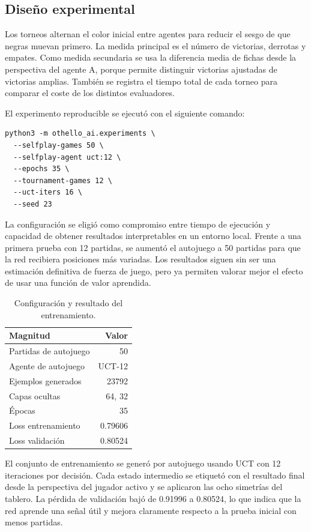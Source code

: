 \documentclass[conference,a4paper]{IEEEtran}
\begin{document}
\subsection{Diseño experimental}

Los torneos alternan el color inicial entre agentes para reducir el sesgo de que
negras muevan primero. La medida principal es el número de victorias, derrotas y
empates. Como medida secundaria se usa la diferencia media de fichas desde la
perspectiva del agente A, porque permite distinguir victorias ajustadas de
victorias amplias. También se registra el tiempo total de cada torneo para
comparar el coste de los distintos evaluadores.

El experimento reproducible se ejecutó con el siguiente comando:

\begin{verbatim}
python3 -m othello_ai.experiments \
  --selfplay-games 50 \
  --selfplay-agent uct:12 \
  --epochs 35 \
  --tournament-games 12 \
  --uct-iters 16 \
  --seed 23
\end{verbatim}

La configuración se eligió como compromiso entre tiempo de ejecución y
capacidad de obtener resultados interpretables en un entorno local. Frente a una
primera prueba con 12 partidas, se aumentó el autojuego a 50 partidas para que
la red recibiera posiciones más variadas. Los resultados siguen sin ser una
estimación definitiva de fuerza de juego, pero ya permiten valorar mejor el
efecto de usar una función de valor aprendida.

\begin{table}[h]
\centering
\caption{Configuración y resultado del entrenamiento.}
\label{tab:entrenamiento}
\begin{tabular}{lr}
\toprule
Magnitud & Valor \\
\midrule
Partidas de autojuego & 50 \\
Agente de autojuego & UCT-12 \\
Ejemplos generados & 23792 \\
Capas ocultas & 64, 32 \\
Épocas & 35 \\
Loss entrenamiento & 0.79606 \\
Loss validación & 0.80524 \\
\bottomrule
\end{tabular}
\end{table}

El conjunto de entrenamiento se generó por autojuego usando UCT con 12
iteraciones por decisión. Cada estado intermedio se etiquetó con el resultado
final desde la perspectiva del jugador activo y se aplicaron las ocho simetrías
del tablero. La pérdida de validación bajó de 0.91996 a 0.80524, lo que indica
que la red aprende una señal útil y mejora claramente respecto a la prueba
inicial con menos partidas.
\end{document}
